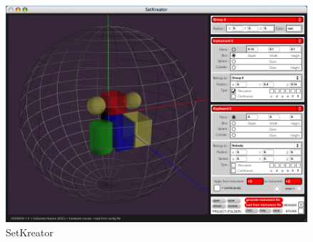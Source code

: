 \begin{figure}[h!]
\centering\includegraphics[scale=0.3]{image/setkreator.png}
\caption{SetKreator}
\label{fig:setkreator}
\end{figure}
